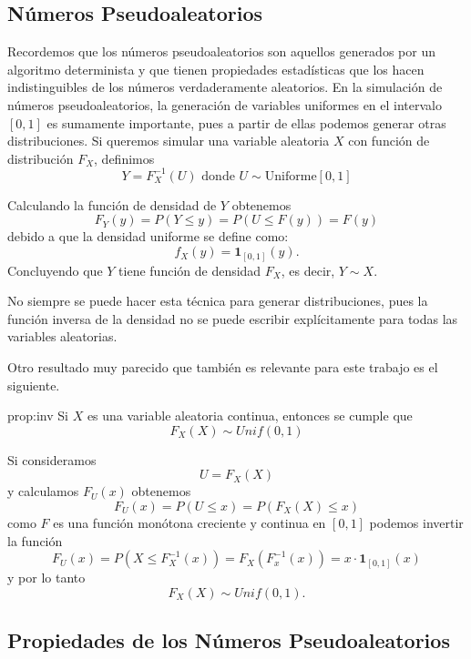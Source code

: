 \documentclass[../Main.tex]{subfiles}
\begin{document}
\subsection{Números Pseudoaleatorios}

Recordemos que los números pseudoaleatorios son aquellos generados por un algoritmo determinista y que tienen propiedades estadísticas que los hacen indistinguibles de los números verdaderamente aleatorios. En la simulación de números pseudoaleatorios, la generación de variables uniformes en el intervalo $[0,1]$ es sumamente importante, pues a partir de ellas podemos generar otras distribuciones. Si queremos simular una variable aleatoria $X$ con función de distribución $F_X$, definimos \[Y=F^{-1}_X(U)\text{  donde   }U\sim \mathrm{Uniforme}[0,1]\] 

Calculando la función de densidad de $Y$ obtenemos
\[F_Y(y)=P(Y\leq y)=P(U\leq F(y))=F(y)\] debido a que la densidad uniforme se define como:
\[f_X(y)=\mathbf{1}_{[0,1]}(y).\] 
Concluyendo que $Y$ tiene función de densidad $F_X$, es decir, $Y\sim X$.
\begin{remark}{}{}
    No siempre se puede hacer esta técnica para generar distribuciones, pues la función inversa de la densidad no se puede escribir explícitamente para todas las variables aleatorias.
\end{remark}
Otro resultado muy parecido que también es relevante para este trabajo es el siguiente. 
\begin{proposition}{}{prop:inv}
    Si $X$ es una variable aleatoria continua, entonces se cumple que \[F_X(X)\sim Unif(0,1)\]
\end{proposition}
\begin{demostracion}{}{}
Si consideramos \[U=F_X(X)\] y calculamos $F_U(x)$ obtenemos
    \[F_U(x)=P(U\leq x) = P(F_X(X)\leq x) \]
    como $F$ es una función monótona creciente y continua en $[0,1]$ podemos invertir la función 
    \[F_U(x)= P(X\leq F^{-1}_X(x))=F_X(F^{-1}_x(x))=x \cdot \mathbf{1}_{[0,1]}(x)\] y por lo tanto  \[F_X(X)\sim Unif(0,1).\]
\end{demostracion}
\subsection{Propiedades de los Números Pseudoaleatorios}
\end{document}
